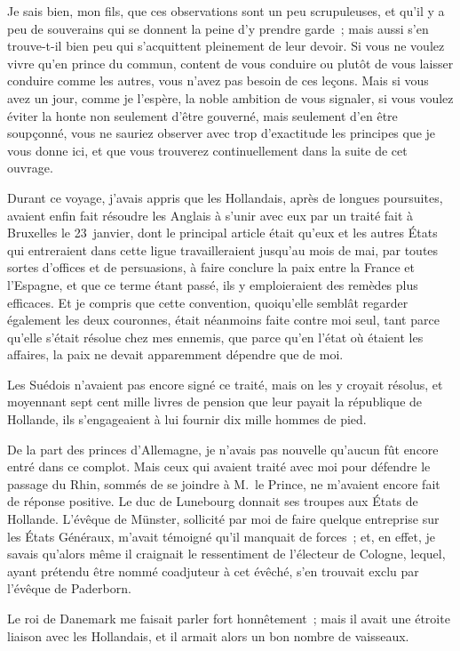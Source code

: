 \documentclass[french,twoside]{book} %
\begin{document}
Je sais bien, mon fils, que ces observations sont un peu scrupuleuses, et qu’il y a peu de souverains qui se donnent la peine d’y prendre garde ; mais aussi s’en trouve-t-il bien peu qui s’acquittent pleinement de leur devoir. Si vous ne voulez vivre qu’en prince du commun, content de vous conduire ou plutôt de vous laisser conduire comme les autres, vous n’avez pas besoin de ces leçons. Mais si vous avez un jour, comme je l’espère, la noble ambition de vous signaler, si vous voulez éviter la honte non seulement d’être gouverné, mais seulement d’en être soupçonné, vous ne sauriez observer avec trop d’exactitude les principes que je vous donne ici, et que vous trouverez continuellement dans la suite de cet ouvrage.\par
Durant ce voyage, j’avais appris que les Hollandais, après de longues poursuites, avaient enfin fait résoudre les Anglais à s’unir avec eux par un traité fait à Bruxelles le 23 janvier, dont le principal article était qu’eux et les autres États qui entreraient dans cette ligue travailleraient jusqu’au mois de mai, par toutes sortes d’offices et de persuasions, à faire conclure la paix entre la France et l’Espagne, et que ce terme étant passé, ils y emploieraient des remèdes plus efficaces. Et je compris que cette convention, quoiqu’elle semblât regarder également les deux couronnes, était néanmoins faite contre moi seul, tant parce qu’elle s’était résolue chez mes ennemis, que parce qu’en l’état où étaient les affaires, la paix ne devait apparemment dépendre que de moi.\par
Les Suédois n’avaient pas encore signé ce traité, mais on les y croyait résolus, et moyennant sept cent mille livres de pension que leur payait la république de Hollande, ils s’engageaient à lui fournir dix mille hommes de pied.\par
De la part des princes d’Allemagne, je n’avais pas nouvelle qu’aucun fût encore entré dans ce complot. Mais ceux qui avaient traité avec moi pour défendre le passage du Rhin, sommés de se joindre à M. le Prince, ne m’avaient encore fait de réponse positive. Le duc de Lunebourg donnait ses troupes aux États de Hollande. L’évêque de Münster, sollicité par moi de faire quelque entreprise sur les États Généraux, m’avait témoigné qu’il manquait de forces ; et, en effet, je savais qu’alors même il craignait le ressentiment de l’électeur de Cologne, lequel, ayant prétendu être nommé coadjuteur à cet évêché, s’en trouvait exclu par l’évêque de Paderborn.\par
Le roi de Danemark me faisait parler fort honnêtement ; mais il avait une étroite liaison avec les Hollandais, et il armait alors un bon nombre de vaisseaux.\par
\end{document}
